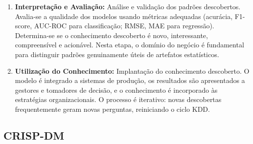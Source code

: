 \documentclass[12pt,a4paper]{article}
\begin{document}
\begin{enumerate}[leftmargin=*, label=\textbf{Etapa \arabic*:}]
  \item \textbf{Interpretação e Avaliação:} Análise e validação dos padrões descobertos. Avalia-se a qualidade dos modelos usando métricas adequadas (acurácia, F1-score, AUC-ROC para classificação; RMSE, MAE para regressão). Determina-se se o conhecimento descoberto é novo, interessante, compreensível e acionável. Nesta etapa, o domínio do negócio é fundamental para distinguir padrões genuinamente úteis de artefatos estatísticos.

  \item \textbf{Utilização do Conhecimento:} Implantação do conhecimento descoberto. O modelo é integrado a sistemas de produção, os resultados são apresentados a gestores e tomadores de decisão, e o conhecimento é incorporado às estratégias organizacionais. O processo é iterativo: novas descobertas frequentemente geram novas perguntas, reiniciando o ciclo KDD.
\end{enumerate}

\begin{center}
\end{center}

\subsection{CRISP-DM}
\end{document}
